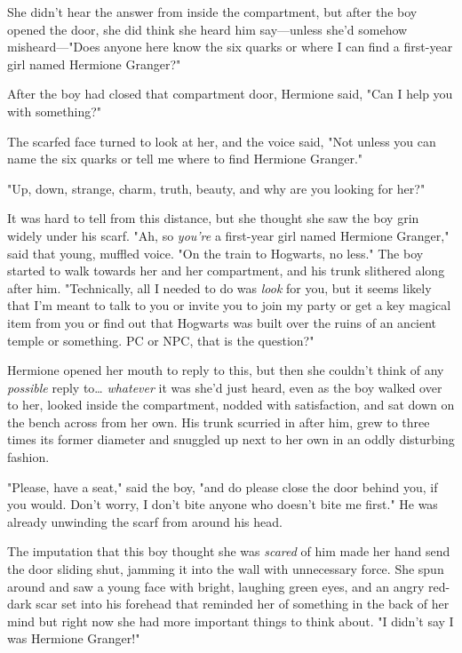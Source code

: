 She didn't hear the answer from inside the compartment, but after the boy 
opened the door, she did think she heard him say---unless she'd somehow 
misheard---"Does anyone here know the six quarks or where I can find a 
first-year girl named Hermione Granger?"

After the boy had closed that compartment door, Hermione said, "Can I help you 
with something?"

The scarfed face turned to look at her, and the voice said, "Not unless you can 
name the six quarks or tell me where to find Hermione Granger."

"Up, down, strange, charm, truth, beauty, and why are you looking for her?"

It was hard to tell from this distance, but she thought she saw the boy grin 
widely under his scarf. "Ah, so \emph{you're} a first-year girl named Hermione 
Granger," said that young, muffled voice. "On the train to Hogwarts, no less." 
The boy started to walk towards her and her compartment, and his trunk 
slithered along after him. "Technically, all I needed to do was \emph{look} for 
you, but it seems likely that I'm meant to talk to you or invite you to join my 
party or get a key magical item from you or find out that Hogwarts was built 
over the ruins of an ancient temple or something. PC or NPC, that is the 
question?"

Hermione opened her mouth to reply to this, but then she couldn't think of any 
\emph{possible} reply to{\ldots} \emph{whatever} it was she'd just heard, even 
as the boy walked over to her, looked inside the compartment, nodded with 
satisfaction, and sat down on the bench across from her own. His trunk scurried 
in after him, grew to three times its former diameter and snuggled up next to 
her own in an oddly disturbing fashion.

"Please, have a seat," said the boy, "and do please close the door behind you, 
if you would. Don't worry, I don't bite anyone who doesn't bite me first." He 
was already unwinding the scarf from around his head.

The imputation that this boy thought she was \emph{scared} of him made her hand 
send the door sliding shut, jamming it into the wall with unnecessary force. 
She spun around and saw a young face with bright, laughing green eyes, and an 
angry red-dark scar set into his forehead that reminded her of something in the 
back of her mind but right now she had more important things to think about. "I 
didn't say I was Hermione Granger!"

